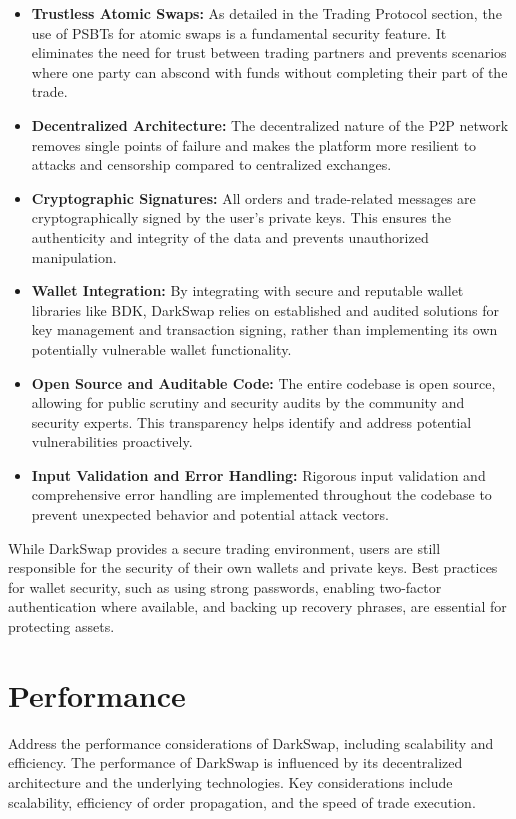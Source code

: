 \documentclass{article}
\begin{document}
\begin{itemize}
    \item \textbf{Trustless Atomic Swaps:} As detailed in the Trading Protocol section, the use of PSBTs for atomic swaps is a fundamental security feature. It eliminates the need for trust between trading partners and prevents scenarios where one party can abscond with funds without completing their part of the trade.
    \item \textbf{Decentralized Architecture:} The decentralized nature of the P2P network removes single points of failure and makes the platform more resilient to attacks and censorship compared to centralized exchanges.
    \item \textbf{Cryptographic Signatures:} All orders and trade-related messages are cryptographically signed by the user's private keys. This ensures the authenticity and integrity of the data and prevents unauthorized manipulation.
    \item \textbf{Wallet Integration:} By integrating with secure and reputable wallet libraries like BDK, DarkSwap relies on established and audited solutions for key management and transaction signing, rather than implementing its own potentially vulnerable wallet functionality.
    \item \textbf{Open Source and Auditable Code:} The entire codebase is open source, allowing for public scrutiny and security audits by the community and security experts. This transparency helps identify and address potential vulnerabilities proactively.
    \item \textbf{Input Validation and Error Handling:} Rigorous input validation and comprehensive error handling are implemented throughout the codebase to prevent unexpected behavior and potential attack vectors.
\end{itemize}

While DarkSwap provides a secure trading environment, users are still responsible for the security of their own wallets and private keys. Best practices for wallet security, such as using strong passwords, enabling two-factor authentication where available, and backing up recovery phrases, are essential for protecting assets.

\section{Performance}
Address the performance considerations of DarkSwap, including scalability and efficiency.
The performance of DarkSwap is influenced by its decentralized architecture and the underlying technologies. Key considerations include scalability, efficiency of order propagation, and the speed of trade execution.
\end{document}
